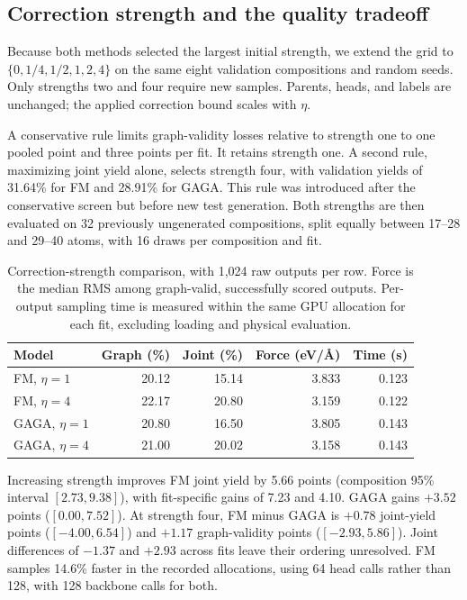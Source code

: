 \subsection{Correction strength and the quality tradeoff}\label{app:connection-strength}
Because both methods selected the largest initial strength, we extend the grid to $\{0,1/4,1/2,1,2,4\}$ on the same eight validation compositions and random seeds. Only strengths two and four require new samples. Parents, heads, and labels are unchanged; the applied correction bound scales with $\eta$.

A conservative rule limits graph-validity losses relative to strength one to one pooled point and three points per fit. It retains strength one. A second rule, maximizing joint yield alone, selects strength four, with validation yields of 31.64\% for FM and 28.91\% for GAGA. This rule was introduced after the conservative screen but before new test generation. Both strengths are then evaluated on 32 previously ungenerated compositions, split equally between 17--28 and 29--40 atoms, with 16 draws per composition and fit.

\begin{table}[htbp]
\centering\small
\caption{Correction-strength comparison, with 1,024 raw outputs per row. Force is the median RMS among graph-valid, successfully scored outputs. Per-output sampling time is measured within the same GPU allocation for each fit, excluding loading and physical evaluation.}
\begin{tabular}{lrrrr}
\toprule
Model & Graph (\%) & Joint (\%) & Force (eV/\AA) & Time (s)\\
\midrule
FM, $\eta=1$ &20.12&15.14&3.833&0.123\\
FM, $\eta=4$ &22.17&20.80&3.159&0.122\\
GAGA, $\eta=1$ &20.80&16.50&3.805&0.143\\
GAGA, $\eta=4$ &21.00&20.02&3.158&0.143\\
\bottomrule
\end{tabular}\label{tab:connection-strength}
\end{table}

Increasing strength improves FM joint yield by 5.66 points (composition 95\% interval $[2.73,9.38]$), with fit-specific gains of 7.23 and 4.10. GAGA gains $+3.52$ points ($[0.00,7.52]$). At strength four, FM minus GAGA is $+0.78$ joint-yield points ($[-4.00,6.54]$) and $+1.17$ graph-validity points ($[-2.93,5.86]$). Joint differences of $-1.37$ and $+2.93$ across fits leave their ordering unresolved. FM samples 14.6\% faster in the recorded allocations, using 64 head calls rather than 128, with 128 backbone calls for both.

